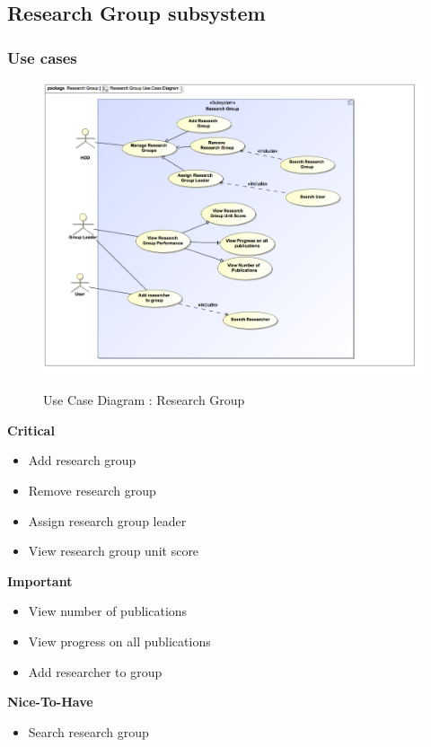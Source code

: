 \documentclass{article}
\begin{document}
\subsection{Research Group subsystem}
	\subsubsection{Use cases}

		\begin{figure}[H]
			\includegraphics[width=\textwidth]{Vuyani_Diagrams/ResearchGroupUseCaseDiagram.jpg}  \\
			\caption{Use Case Diagram : Research Group}
		\end{figure}
		\begin{flushleft}
			\textbf{Critical}
				\begin{itemize}
	  				\item Add research group
	  				\item Remove research group
					\item Assign research group leader
					\item View research group unit score
				\end{itemize}

			\textbf{Important}
				\begin{itemize}
	  				\item View number of publications
	  				\item View progress on all publications
					\item Add researcher to group
				\end{itemize}

			\textbf{Nice-To-Have}
				\begin{itemize}
	  				\item Search research group
				\end{itemize}
		\end{flushleft}
\end{document}

